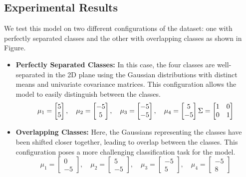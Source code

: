 \documentclass{article}
\begin{document}
\subsection*{Experimental Results}
We test this model on two different configurations of the dataset: one with perfectly separated classes and the other with overlapping classes as shown in Figure.
\begin{itemize}
    \item \textbf{Perfectly Separated Classes:} In this case, the four classes are well-separated in the 2D plane using the Gaussian distributions with distinct means and univariate covariance matrices. This configuration allows the model to easily distinguish between the classes.
    \[
    \mu_1 = \begin{bmatrix} 5 \\ 5 \end{bmatrix}, \quad \mu_2 = \begin{bmatrix} -5 \\ 5 \end{bmatrix}, \quad \mu_3 = \begin{bmatrix} -5 \\ -5 \end{bmatrix}, \quad \mu_4 = \begin{bmatrix} 5 \\ -5 \end{bmatrix} \\ \Sigma = \begin{bmatrix} 1 & 0 \\ 0 & 1 \end{bmatrix}
    \]
    \item \textbf{Overlapping Classes:} Here, the Gaussians representing the classes have been shifted closer together, leading to overlap between the classes. This configuration poses a more challenging classification task for the model.
    \[
    \mu_1 = \begin{bmatrix} 0 \\ -5 \end{bmatrix}, \quad \mu_2 = \begin{bmatrix} 5 \\ -5 \end{bmatrix}, \quad \mu_3 = \begin{bmatrix} -5 \\ 5 \end{bmatrix}, \quad \mu_4 = \begin{bmatrix} -5 \\ 8 \end{bmatrix} 
\]
\end{itemize}
\end{document}
